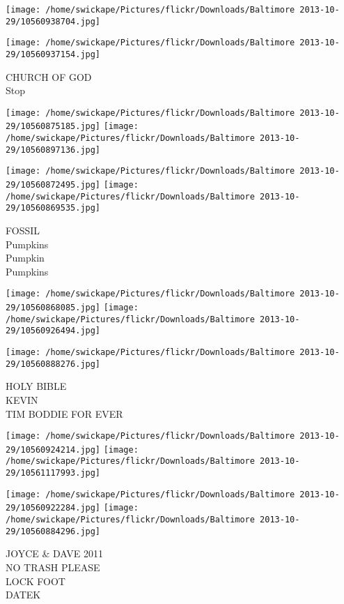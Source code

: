\documentclass[10pt,letterpaper]{article}
\begin{document}
\texttt{[image: /home/swickape/Pictures/flickr/Downloads/Baltimore 2013-10-29/10560938704.jpg]}

\vspace{0.25in}
\texttt{[image: /home/swickape/Pictures/flickr/Downloads/Baltimore 2013-10-29/10560937154.jpg]}

CHURCH OF GOD\\
Stop
\pagebreak

\texttt{[image: /home/swickape/Pictures/flickr/Downloads/Baltimore 2013-10-29/10560875185.jpg]}
\texttt{[image: /home/swickape/Pictures/flickr/Downloads/Baltimore 2013-10-29/10560897136.jpg]}

\texttt{[image: /home/swickape/Pictures/flickr/Downloads/Baltimore 2013-10-29/10560872495.jpg]}
\texttt{[image: /home/swickape/Pictures/flickr/Downloads/Baltimore 2013-10-29/10560869535.jpg]}

FOSSIL\\
Pumpkins\\
Pumpkin\\
Pumpkins
\pagebreak

\texttt{[image: /home/swickape/Pictures/flickr/Downloads/Baltimore 2013-10-29/10560868085.jpg]}
\texttt{[image: /home/swickape/Pictures/flickr/Downloads/Baltimore 2013-10-29/10560926494.jpg]}

\vspace{0.25in}
\texttt{[image: /home/swickape/Pictures/flickr/Downloads/Baltimore 2013-10-29/10560888276.jpg]}

HOLY BIBLE\\
KEVIN\\
TIM BODDIE FOR EVER
\pagebreak

\texttt{[image: /home/swickape/Pictures/flickr/Downloads/Baltimore 2013-10-29/10560924214.jpg]}
\texttt{[image: /home/swickape/Pictures/flickr/Downloads/Baltimore 2013-10-29/10561117993.jpg]}

\texttt{[image: /home/swickape/Pictures/flickr/Downloads/Baltimore 2013-10-29/10560922284.jpg]}
\texttt{[image: /home/swickape/Pictures/flickr/Downloads/Baltimore 2013-10-29/10560884296.jpg]}

JOYCE \& DAVE 2011\\
NO TRASH PLEASE\\
LOCK FOOT\\
DATEK
\pagebreak
\end{document}
